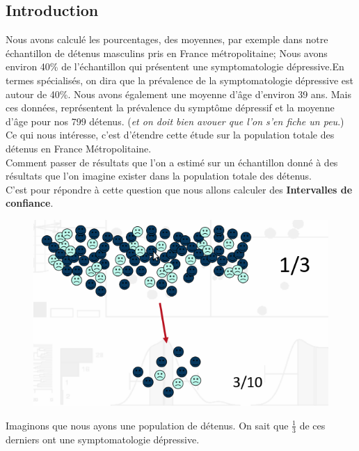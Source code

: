 \subsection{Introduction}
Nous avons calculé les pourcentages, des moyennes, par exemple dans notre échantillon de détenus masculins pris en France métropolitaine; Nous avons environ 40\% de l'échantillon qui présentent une symptomatologie dépressive.En termes spécialisés, on dira que la prévalence de la symptomatologie dépressive est autour de 40\%.\newline
Nous avons également une moyenne d'âge d'environ 39 ans. Mais ces données, représentent la prévalence du symptôme dépressif et la moyenne d'âge pour nos 799 détenus. (\textit{et on doit bien avouer que l'on s'en fiche un peu}.)\newline
Ce qui nous intéresse, c'est d'étendre cette étude sur la population totale des détenus en France Métropolitaine.\newline
\\
Comment passer de résultats que l'on a estimé sur un échantillon donné à des résultats que l'on imagine exister dans la population totale des détenus.\newline
\\
C'est pour répondre à cette question que nous allons calculer des \textbf{Intervalles de confiance}.\newline
\begin{figure}[H]\begin{center}\includegraphics[scale=0.35]{ilu/bo.png}\end{center}\end{figure}
Imaginons que nous ayons une population de détenus. On sait que $\frac{1}{3}$ de ces derniers ont une symptomatologie dépressive.\newline
